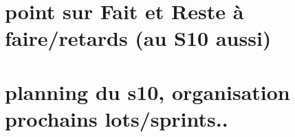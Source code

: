 \section{point sur Fait et Reste à faire/retards (au S10 aussi)}
\section{planning du s10, organisation prochains lots/sprints..}